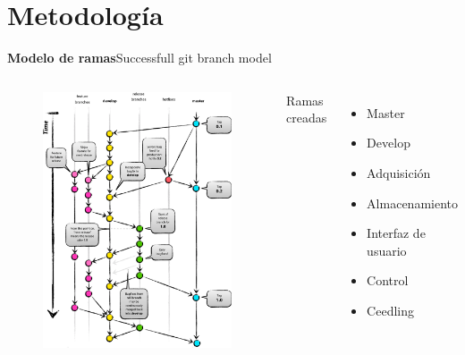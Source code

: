 \documentclass[11pt]{beamer}
\begin{document}
\section{Metodología}

\begin{frame}{\textbf{\LARGE{Modelo de ramas}}}{Successfull git branch model}
	\begin{columns}
	  	\vspace{-1.3cm}
	  \begin{figure}[H]
    		\includegraphics[height=.8\textheight]{./imagenes/Git-branching-model.pdf}
	  \end{figure}	
	\hfill
	Ramas creadas
	  \begin{itemize}[]
		  \item Master
		  \item Develop
		  \item Adquisición
	  	  \item Almacenamiento
	  	  \item Interfaz de usuario
	 	  \item Control
	 	  \item Ceedling
	  \end{itemize}
	\end{columns}
\end{frame}
\end{document}
